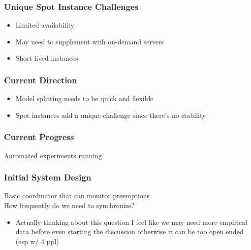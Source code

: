   \begin{frame}
    \frametitle{Unique Spot Instance Challenges}

    \begin{itemize}
      \item Limited availability

      \vspace{2em}
      \item May need to supplement with on-demand servers

      \vspace{2em}
      \item Short lived instances

    \end{itemize}

  \end{frame}

  \begin{frame}
    \frametitle{Current Direction}

    \vspace{2em}
    \begin{itemize}
      \item Model splitting needs to be quick and flexible
      \vspace{2em}
      \item Spot instances add a unique challenge since there's no stability
    \end{itemize}
  \end{frame}

  \begin{frame}
    \frametitle{Current Progress}

    Automated experiments running

  \end{frame}

  \begin{frame}
    \frametitle{Initial System Design}

    Basic coordinator that can monitor preemptions \\
    How frequently do we need to synchronize?
    \begin{itemize}
        \item Actually thinking about this question I feel like we may
            need more empirical data before even starting the discussion
            otherwise it can be too open ended (esp w/ 4 ppl)
    \end{itemize}

  \end{frame}

